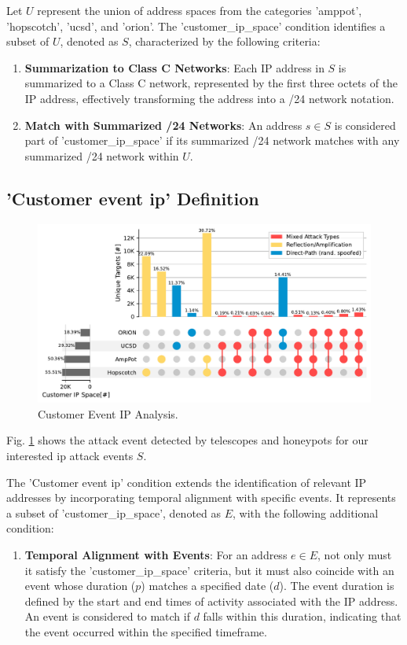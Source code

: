 Let $U$ represent the union of address spaces from the categories 'amppot', 'hopscotch', 'ucsd', and 'orion'. The 'customer\_ip\_space' condition identifies a subset of $U$, denoted as $S$, characterized by the following criteria:
\begin{enumerate}
    \item \textbf{Summarization to Class C Networks}: Each IP address in $S$ is summarized to a Class C network, represented by the first three octets of the IP address, effectively transforming the address into a /24 network notation.
    \item \textbf{Match with Summarized /24 Networks}: An address $s \in S$ is considered part of 'customer\_ip\_space' if its summarized /24 network matches with any summarized /24 network within $U$.
\end{enumerate}

\subsection*{'Customer event ip' Definition}
\begin{figure}[htbp]
    \centering
    \includegraphics[scale=0.4]{graphs/space_no_event.pdf}
    \caption{Customer Event IP Analysis.}
    \label{fig:customereventip}
\end{figure}
Fig. \ref{fig:customereventip} shows the attack event detected by telescopes and honeypots for our interested ip attack events $S$.


The 'Customer event ip' condition extends the identification of relevant IP addresses by incorporating temporal alignment with specific events. It represents a subset of 'customer\_ip\_space', denoted as $E$, with the following additional condition:

\begin{enumerate}
    \item \textbf{Temporal Alignment with Events}: For an address $e \in E$, not only must it satisfy the 'customer\_ip\_space' criteria, but it must also coincide with an event whose duration ($p$) matches a specified date ($d$). The event duration is defined by the start and end times of activity associated with the IP address. An event is considered to match if $d$ falls within this duration, indicating that the event occurred within the specified timeframe.
\end{enumerate}


